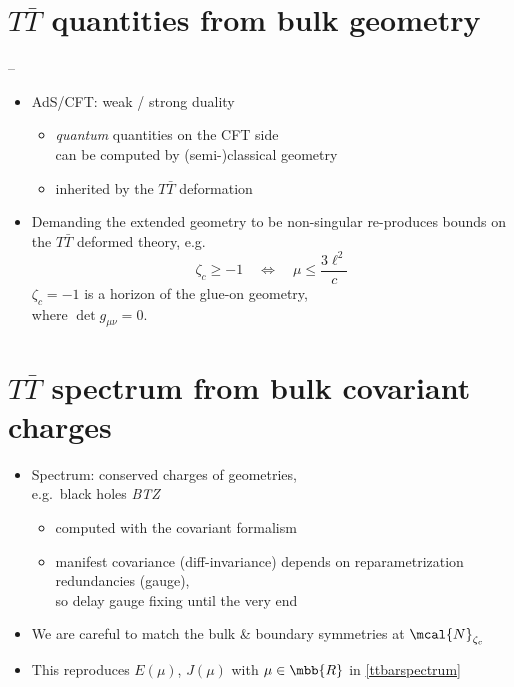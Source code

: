 \documentclass[10pt]{article}
\renewenvironment{frame}[1]%
	{\section*{#1}}%
	{\clearpage}
\newcommand{\pause}{}
\newenvironment{columns}%
	{\par\begin{minipage}{\textwidth}}%
	{\end{minipage}}
\newenvironment{column}[1]%
	{\begin{minipage}{#1}}%
	{\end{minipage}}
\newcommand{\TTbar}{\texorpdfstring{\ensuremath{T\bar{T}}}{TTbar}\xspace}
\begin{document}
\begin{frame}{\TTbar quantities from bulk geometry}{%
	\textcite{Apolo:2023vnm} -- 
}
\begin{columns}
\figGlueon[.3]
\begin{column}{.7\textwidth}
\begin{itemize}
\item AdS/CFT: weak / strong duality
	\begin{itemize}
	\item \textit{quantum} quantities on the CFT side\\
		can be computed by (semi-)classical geometry
	\item inherited by the \TTbar deformation
	\end{itemize}
	
\pause
\item Demanding the extended geometry to be non-singular
	re-produces bounds on the \TTbar deformed theory, e.g.
	\begin{equation}
		\zeta_c \ge -1 \quad \Leftrightarrow \quad\mu\le \frac{ 3\ell^2 }{c} \label{reality}
	\end{equation}
	$\zeta_c = -1$ is a horizon of the glue-on geometry, \\
	where $\det g_{\mu\nu} = 0$.
	
\end{itemize}
\end{column}
\end{columns}
\end{frame}


\begin{frame}{\TTbar spectrum from bulk covariant charges}{%
	\textcite{Kraus:2021cwf,Apolo:2023vnm}
}
\begin{columns}
\figGlueon[.3]
\begin{column}{.7\textwidth}
\begin{itemize}
\item Spectrum: conserved charges of geometries,\\
	e.g.~black holes \textit{BTZ} \cite{Banados:1992wn}
	\begin{itemize}
	\item computed with the covariant formalism\\
		\textcite{Iyer:1994ys, Barnich:2001jy}
	\item manifest covariance (diff-invariance) depends on reparametrization redundancies (gauge),\\
		so delay gauge fixing until the very end
	\end{itemize}
	
\pause
\item We are careful to match the bulk \& boundary symmetries at $\mcal{N}_{\zeta_c}$

\item This reproduces $E(\mu)$, $J(\mu)$ with $\mu \in\mbb{R}$ in \eqref{ttbarspectrum}
	
\end{itemize}
\end{column}
\end{columns}
\end{frame}
\end{document}
